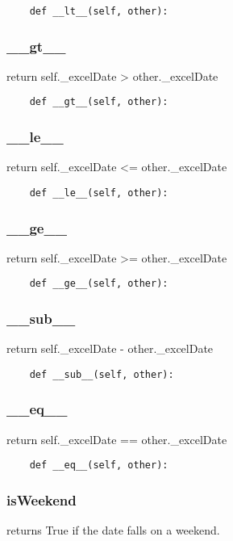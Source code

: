 \documentclass[twoside,11pt]{book}
\begin{document}
\begin{lstlisting}
    def __lt__(self, other):
\end{lstlisting}

\subsubsection*{{\bf \_\_gt\_\_}}
return self.\_excelDate > other.\_excelDate 

\begin{lstlisting}
    def __gt__(self, other):
\end{lstlisting}

\subsubsection*{{\bf \_\_le\_\_}}
return self.\_excelDate <= other.\_excelDate 

\begin{lstlisting}
    def __le__(self, other):
\end{lstlisting}

\subsubsection*{{\bf \_\_ge\_\_}}
return self.\_excelDate >= other.\_excelDate 

\begin{lstlisting}
    def __ge__(self, other):
\end{lstlisting}

\subsubsection*{{\bf \_\_sub\_\_}}
return self.\_excelDate - other.\_excelDate 

\begin{lstlisting}
    def __sub__(self, other):
\end{lstlisting}

\subsubsection*{{\bf \_\_eq\_\_}}
return self.\_excelDate == other.\_excelDate 

\begin{lstlisting}
    def __eq__(self, other):
\end{lstlisting}

\subsubsection*{{\bf isWeekend}}
returns True if the date falls on a weekend.  
\end{document}

